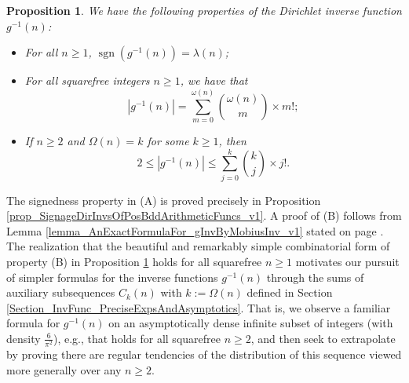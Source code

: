 \documentclass[11pt,reqno,a4letter]{article}
\numberwithin{figure}{section}
\numberwithin{table}{section}
\theoremstyle{plain}
\newtheorem{prop}[theorem]{Proposition}
\numberwithin{theorem}{section}
\theoremstyle{definition}
\begin{document}
\begin{prop} 
\label{lemma_gInv_MxExample} 
We have the following properties of the 
Dirichlet inverse function $g^{-1}(n)$: 
\begin{itemize} 

\item[\textbf{(A)}] For all $n \geq 1$, $\operatorname{sgn}(g^{-1}(n)) = \lambda(n)$; 
\item[\textbf{(B)}] For all squarefree integers $n \geq 1$, we have that 
     \[
     |g^{-1}(n)| = \sum_{m=0}^{\omega(n)} \binom{\omega(n)}{m} \times m!; 
     \]
\item[\textbf{(C)}] If $n \geq 2$ and $\Omega(n) = k$ for some $k \geq 1$, then 
     \[
     2 \leq |g^{-1}(n)| \leq \sum_{j=0}^{k} \binom{k}{j} \times j!. 
     \]
\end{itemize} 
\end{prop} 

The signedness property in (A) is proved precisely in 
Proposition \ref{prop_SignageDirInvsOfPosBddArithmeticFuncs_v1}. 
A proof of (B) follows from 
Lemma \ref{lemma_AnExactFormulaFor_gInvByMobiusInv_v1} 
stated on page \pageref{lemma_AnExactFormulaFor_gInvByMobiusInv_v1}. 
The realization that the beautiful and remarkably simple combinatorial form of property (B) 
in Proposition \ref{lemma_gInv_MxExample} holds for all squarefree $n \geq 1$ 
motivates our pursuit of simpler formulas for the inverse functions $g^{-1}(n)$ 
through the sums of auxiliary subsequences $C_k(n)$ with $k := \Omega(n)$ 
defined in Section \ref{Section_InvFunc_PreciseExpsAndAsymptotics}. 
That is, we observe a familiar formula for $g^{-1}(n)$ 
on an asymptotically dense infinite subset of integers (with density $\frac{6}{\pi^2}$), 
e.g., that holds for all squarefree $n \geq 2$, and then seek 
to extrapolate by proving there are regular tendencies of the distribution of this sequence viewed 
more generally over any $n \geq 2$. 
\end{document}

